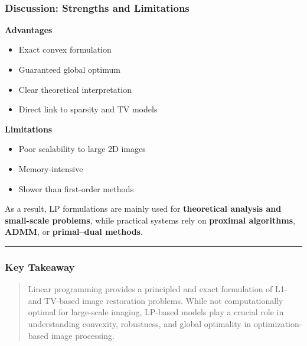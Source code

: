 \documentclass[11pt]{article}
\providecommand{\tightlist}{%
      \setlength{\itemsep}{0pt}\setlength{\parskip}{0pt}}
\begin{document}
    \begin{center}
    \end{center}
    { \hspace*{\fill} \\}
    
    \hypertarget{discussion-strengths-and-limitations}{%
\subsubsection{Discussion: Strengths and
Limitations}\label{discussion-strengths-and-limitations}}

\textbf{Advantages}

\begin{itemize}
\tightlist
\item
  Exact convex formulation
\item
  Guaranteed global optimum
\item
  Clear theoretical interpretation
\item
  Direct link to sparsity and TV models
\end{itemize}

\textbf{Limitations}

\begin{itemize}
\tightlist
\item
  Poor scalability to large 2D images
\item
  Memory-intensive
\item
  Slower than first-order methods
\end{itemize}

As a result, LP formulations are mainly used for \textbf{theoretical
analysis and small-scale problems}, while practical systems rely on
\textbf{proximal algorithms}, \textbf{ADMM}, or \textbf{primal--dual
methods}.

\begin{center}\rule{0.5\linewidth}{0.5pt}\end{center}

\hypertarget{key-takeaway}{%
\subsubsection{Key Takeaway}\label{key-takeaway}}

\begin{quote}
Linear programming provides a principled and exact formulation of L1-
and TV-based image restoration problems. While not computationally
optimal for large-scale imaging, LP-based models play a crucial role in
understanding convexity, robustness, and global optimality in
optimization-based image processing.
\end{quote}
\end{document}
